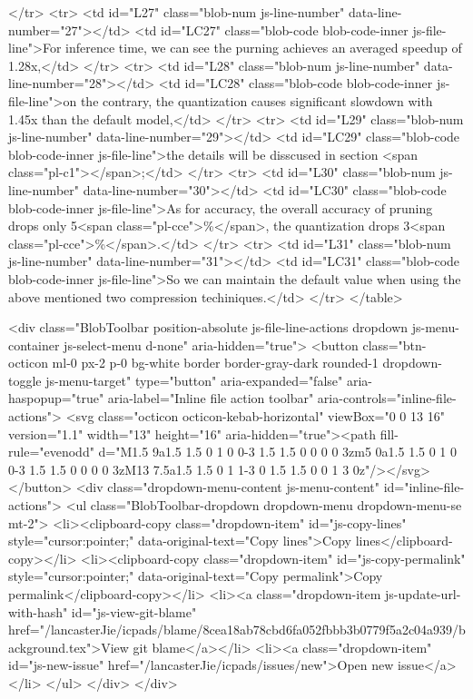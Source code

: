       </tr>
      <tr>
        <td id="L27" class="blob-num js-line-number" data-line-number="27"></td>
        <td id="LC27" class="blob-code blob-code-inner js-file-line">For inference time, we can see the purning achieves an averaged speedup of 1.28x,</td>
      </tr>
      <tr>
        <td id="L28" class="blob-num js-line-number" data-line-number="28"></td>
        <td id="LC28" class="blob-code blob-code-inner js-file-line">on the contrary, the quantization causes significant slowdown with 1.45x than the default model,</td>
      </tr>
      <tr>
        <td id="L29" class="blob-num js-line-number" data-line-number="29"></td>
        <td id="LC29" class="blob-code blob-code-inner js-file-line">the details will be disscused in section <span class="pl-c1">\FIXME</span>{};</td>
      </tr>
      <tr>
        <td id="L30" class="blob-num js-line-number" data-line-number="30"></td>
        <td id="LC30" class="blob-code blob-code-inner js-file-line">As for accuracy,  the overall accuracy of pruning drops only 5<span class="pl-cce">\%</span>, the quantization drops 3<span class="pl-cce">\%</span>.</td>
      </tr>
      <tr>
        <td id="L31" class="blob-num js-line-number" data-line-number="31"></td>
        <td id="LC31" class="blob-code blob-code-inner js-file-line">So we can maintain the default value when using the above mentioned two compression techiniques.</td>
      </tr>
</table>

  <div class="BlobToolbar position-absolute js-file-line-actions dropdown js-menu-container js-select-menu d-none" aria-hidden="true">
    <button class="btn-octicon ml-0 px-2 p-0 bg-white border border-gray-dark rounded-1 dropdown-toggle js-menu-target" type="button" aria-expanded="false" aria-haspopup="true" aria-label="Inline file action toolbar" aria-controls="inline-file-actions">
      <svg class="octicon octicon-kebab-horizontal" viewBox="0 0 13 16" version="1.1" width="13" height="16" aria-hidden="true"><path fill-rule="evenodd" d="M1.5 9a1.5 1.5 0 1 0 0-3 1.5 1.5 0 0 0 0 3zm5 0a1.5 1.5 0 1 0 0-3 1.5 1.5 0 0 0 0 3zM13 7.5a1.5 1.5 0 1 1-3 0 1.5 1.5 0 0 1 3 0z"/></svg>
    </button>
    <div class="dropdown-menu-content js-menu-content" id="inline-file-actions">
      <ul class="BlobToolbar-dropdown dropdown-menu dropdown-menu-se mt-2">
        <li><clipboard-copy class="dropdown-item" id="js-copy-lines" style="cursor:pointer;" data-original-text="Copy lines">Copy lines</clipboard-copy></li>
        <li><clipboard-copy class="dropdown-item" id="js-copy-permalink" style="cursor:pointer;" data-original-text="Copy permalink">Copy permalink</clipboard-copy></li>
        <li><a class="dropdown-item js-update-url-with-hash" id="js-view-git-blame" href="/lancasterJie/icpads/blame/8cea18ab78cbd6fa052fbbb3b0779f5a2c04a939/background.tex">View git blame</a></li>
          <li><a class="dropdown-item" id="js-new-issue" href="/lancasterJie/icpads/issues/new">Open new issue</a></li>
      </ul>
    </div>
  </div>

